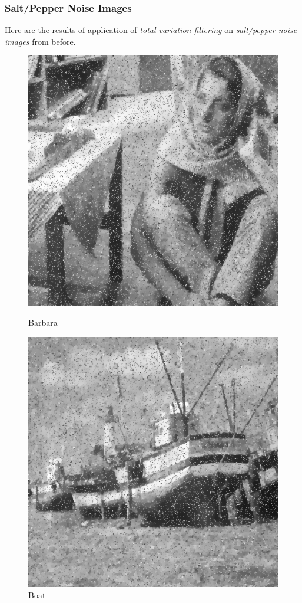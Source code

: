 \documentclass{article}
\begin{document}
    \pagebreak
    \subsubsection*{Salt/Pepper Noise Images}
    Here are the results of application of \textit{total variation filtering} on \textit{salt/pepper noise images} from before.
    
    \begin{figure}[!htb]
      \includegraphics[scale=.45]{./edge_preserving_smoothing/barbara/sp.png}
      \caption{Barbara}
    \endminipage \hfill
      \includegraphics[scale=.45]{./edge_preserving_smoothing/boat/sp.png}
      \caption{Boat}
    \endminipage
    \end{figure}
    
\end{document}
